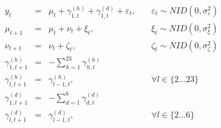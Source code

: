 \documentclass[11pt]{llncs} %
\begin{document}
\begin{center}
\begin{equation}
\label{eq:univariate-model}
\begin{array}{rcll}
y_t & = & \mu_{t} + \gamma_{1,t}^{(h)} + \gamma_{1,t}^{(d)} + \varepsilon_{t}, &\quad \varepsilon_{t} \sim NID(0, \sigma^{2}_{\varepsilon}) \\
\mu_{t+1} & = & \mu_{t} + \nu_{t} + \xi_{t}, & \quad \xi_{t} \sim NID(0, \sigma^{2}_{\xi}) \\
\nu_{t+1} & = & \nu_{t} + \zeta_{t}, &\quad \zeta_{t} \sim NID(0, \sigma^{2}_{\zeta}) \\
\gamma_{1,t+1}^{(h)} & = & - \sum_{h = 1}^{23} {\gamma_{h,t}^{(h)}} & \\
\gamma_{l,t+1}^{(h)} & = & \gamma_{l-1,t}^{(h)}, & \quad \forall l \in \{2\dots23\} \\
\gamma_{1,t+1}^{(d)} & = & - \sum_{d = 1}^{6} {\gamma_{d,t}^{(d)}} & \\
\gamma_{l,t+1}^{(d)} & = & \gamma_{l-1,t}^{(d)}, & \quad \forall l \in \{2\dots6\} \\
\end{array}
\end{equation}
\end{center}

\end{document}
